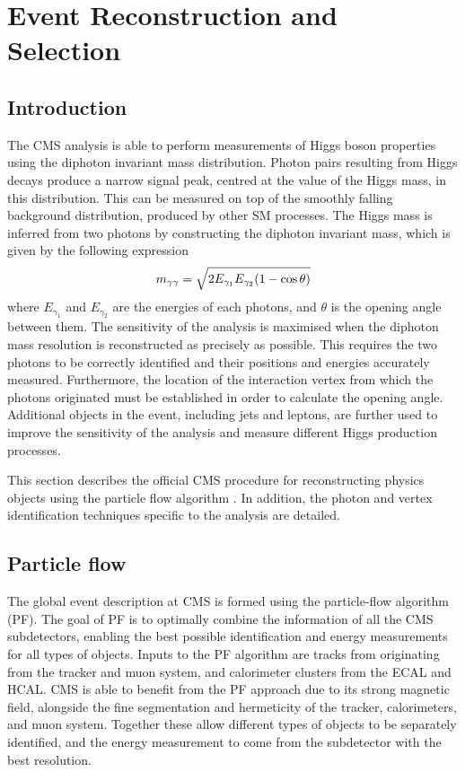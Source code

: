 \chapter{Event Reconstruction and Selection}
\label{chap:objects}

\section{Introduction}

The CMS \Hgg analysis is able to perform measurements of Higgs boson properties using the diphoton invariant mass distribution.
Photon pairs resulting from Higgs decays produce a narrow signal peak, centred at the value of the Higgs mass, in this distribution.
This can be measured on top of the smoothly falling background distribution, produced by other SM processes.
The Higgs mass is inferred from two photons by constructing the diphoton invariant mass, which is given by the following expression
\begin{equation}
m_{\gamma\gamma} = \sqrt{ 2 E_{\gamma_1} E_{\gamma_2} (1 - \cos{\theta}) }
\end{equation}
where $E_{\gamma_1}$ and $E_{\gamma_2}$ are the energies of each photons, and $\theta$ is the opening angle between them.
The sensitivity of the analysis is maximised when the diphoton mass resolution is reconstructed as precisely as possible.
This requires the two photons to be correctly identified and their positions and energies accurately measured.
Furthermore, the location of the interaction vertex from which the photons originated must be established in order to calculate the opening angle.
Additional objects in the event, including jets and leptons, are further used to improve the sensitivity of the analysis and measure different Higgs production processes.

This section describes the official CMS procedure for reconstructing physics objects using the particle flow algorithm \cite{ParticleFlow}.
In addition, the photon and vertex identification techniques specific to the \Hgg analysis are detailed.

\section{Particle flow}
The global event description at CMS is formed using the particle-flow algorithm (PF).
The goal of PF is to optimally combine the information of all the CMS subdetectors, 
enabling the best possible identification and energy measurements for all types of objects.
Inputs to the PF algorithm are tracks from originating from the tracker and muon system, 
and calorimeter clusters from the ECAL and HCAL.
CMS is able to benefit from the PF approach due to its strong magnetic field, 
alongside the fine segmentation and hermeticity of the tracker, calorimeters, and muon system.
Together these allow different types of objects to be separately identified, 
and the energy measurement to come from the subdetector with the best resolution.

